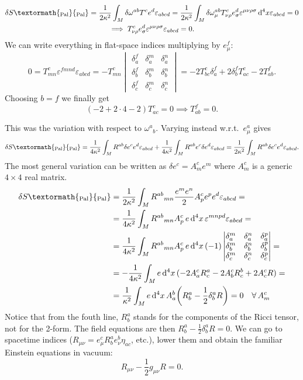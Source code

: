 \documentclass[a4paper,12pt]{book}
\newcommand{\ped}[1]{\textormath{\textsubscript{#1}}{_{\mathrm{#1}}}}
\newcommand{\dd}{\mathop{\mathrm{d}\!}{}}
\theoremstyle{definition}
\theoremstyle{remark}
\begin{document}
\begin{gather*}\delta S\ped{Pal}=\frac{1}{2\kappa^2}\int_M\delta\omega^{ab}T^ce^d\varepsilon_{abcd}=\frac{1}{2\kappa^2}\int_M\delta\omega_\mu^{ab}T_{\nu\rho}^ce^d_\sigma\varepsilon^{\mu\nu\rho\sigma}\dd^4x\varepsilon_{abcd}=0\\
\implies T_{\nu\rho}^ce^d_\sigma\varepsilon^{\mu\nu\rho\sigma}\varepsilon_{abcd}=0.
\end{gather*}
We can write everything in flat-space indices multiplying by $e^f_\mu$:
\[0=T^c_{mn}\varepsilon^{fmnd}\varepsilon_{abcd}=-T^c_{mn}
\begin{vmatrix}
\delta^f_a & \delta^m_a & \delta^n_a \\
\delta^f_b & \delta^m_b & \delta^n_b \\
\delta^f_c & \delta^m_c & \delta^n_c
\end{vmatrix}
=-2T^c_{bc}\delta^f_a+2\delta^f_bT^c_{ac}-2T^f_{ab}.
\]
Choosing $b=f$ we finally get
\[(-2+2\cdot4-2)T^c_{ac}=0\implies T^f_{ab}=0.\]

This was the variation with respect to $\omega^a{}_b$. Varying instead w.r.t.~$e^a_\mu$ gives
\[\delta S\ped{Pal}=\frac{1}{4\kappa^2}\int_MR^{ab}\delta e^ce^d\varepsilon_{abcd}+\frac{1}{4\kappa^2}\int_MR^{ab} e^c\delta e^d\varepsilon_{abcd}=\frac{1}{2\kappa^2}\int_MR^{ab}\delta e^ce^d\varepsilon_{abcd}.\]
The most general variation can be written as $\delta e^c=A^c_me^m$ where $A^c_m$ is a generic $4\times4$ real matrix.
\begin{align*}
\delta S\ped{Pal}&=\frac{1}{2\kappa^2}\int_MR^{ab}{}_{mn}\frac{e^me^n}{2}A^c_pe^pe^d\varepsilon_{abcd}=\\
&=\frac{1}{4\kappa^2}\int_MR^{ab}{}_{mn}A^c_p\,e\dd^4x\,\varepsilon^{mnpd}\varepsilon_{abcd}=\\
&=\frac{1}{4\kappa^2}\int_MR^{ab}{}_{mn}A^c_p\,e\dd^4x\,(-1)
\begin{vmatrix}
\delta^m_a & \delta^n_a & \delta^p_a \\
\delta^m_b & \delta^n_b & \delta^p_b \\
\delta^m_c & \delta^n_c & \delta^p_c
\end{vmatrix}=\\
&=-\frac{1}{4\kappa^2}\int_Me\dd^4x\,(-2A^c_aR^a_c-2A^c_bR^b_c+2A^c_cR)=\\
&=\frac{1}{\kappa^2}\int_Me\dd^4x\,A^b_a\biggl(R^a_b-\frac{1}{2}\delta^a_bR\biggr)=0\quad\forall\,A^c_m\\
\end{align*}
Notice that from the fouth line, $R^a_b$ stands for the components of the Ricci tensor, not for the 2-form. The field equations are then $R^a_b-\frac{1}{2}\delta^a_bR=0$. We can go to spacetime indices ($R_{\mu\nu}=e^c_\mu R^a_be^b_\nu\eta_{ac}$, etc.), lower them and obtain the familiar Einstein equations in vacuum:
\[R_{\mu\nu}-\frac{1}{2}g_{\mu\nu}R=0.\]
\end{document}

